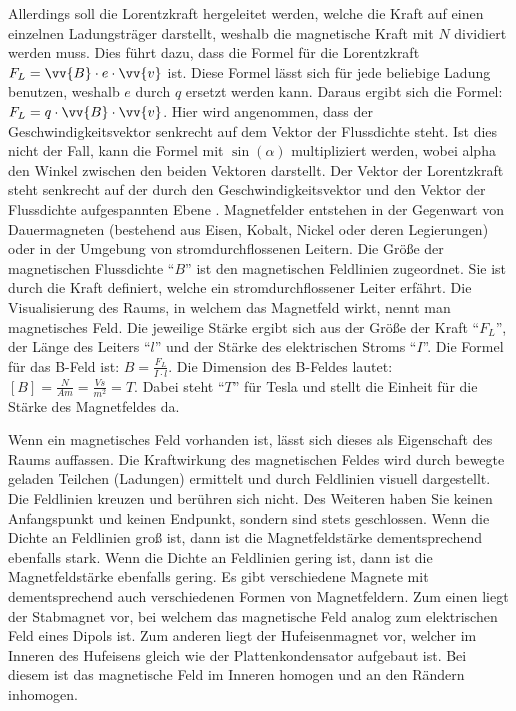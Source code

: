 Allerdings soll die Lorentzkraft hergeleitet werden, welche die Kraft auf einen einzelnen Ladungsträger darstellt, weshalb die magnetische Kraft mit $N$ dividiert werden muss.
Dies führt dazu, dass die Formel für die Lorentzkraft $F_L =\vv{B} \cdot e \cdot \vv{v}$ ist.
Diese Formel lässt sich für jede beliebige Ladung benutzen, weshalb $e$ durch $q$ ersetzt werden kann.
Daraus ergibt sich die Formel: $F_L = q \cdot \vv{B} \cdot \vv{v}$.
Hier wird angenommen, dass der Geschwindigkeitsvektor senkrecht auf dem Vektor der Flussdichte steht.
Ist dies nicht der Fall, kann die Formel mit $\sin(\alpha)$ multipliziert werden, wobei alpha den Winkel zwischen den beiden Vektoren darstellt.
Der Vektor der Lorentzkraft steht senkrecht auf der durch den Geschwindigkeitsvektor und den Vektor der Flussdichte aufgespannten Ebene \cite{Lorentzkraft}.
Magnetfelder entstehen in der Gegenwart von Dauermagneten (bestehend aus Eisen, Kobalt, Nickel oder deren Legierungen) oder in der Umgebung von stromdurchflossenen Leitern. 
Die Größe der magnetischen Flussdichte "`$B$"' ist den magnetischen Feldlinien zugeordnet.
Sie ist durch die Kraft definiert, welche ein stromdurchflossener Leiter erfährt.
Die Visualisierung des Raums, in welchem das Magnetfeld wirkt, nennt man magnetisches Feld.
Die jeweilige Stärke ergibt sich aus der Größe der Kraft "`$F_L$"', der Länge des Leiters "`$l$"' und der Stärke des elektrischen Stroms "`$I$"'.
Die Formel für das B-Feld ist: $B = \frac{F_L}{I \cdot l}$.
Die Dimension des B-Feldes lautet: $[B] = \frac{N}{Am} = \frac{Vs}{m^2} = T$.
Dabei steht "`$T$"' für Tesla und stellt die Einheit für die Stärke des Magnetfeldes da.

Wenn ein magnetisches Feld vorhanden ist, lässt sich dieses als Eigenschaft des Raums auffassen.
Die Kraftwirkung des magnetischen Feldes wird durch bewegte geladen Teilchen (Ladungen) ermittelt und durch Feldlinien visuell dargestellt.
Die Feldlinien kreuzen und berühren sich nicht.
Des Weiteren haben Sie keinen Anfangspunkt und keinen Endpunkt, sondern sind stets geschlossen.
Wenn die Dichte an Feldlinien groß ist, dann ist die Magnetfeldstärke dementsprechend ebenfalls stark.
Wenn die Dichte an Feldlinien gering ist, dann ist die Magnetfeldstärke ebenfalls gering.
Es gibt verschiedene Magnete mit dementsprechend auch verschiedenen Formen von Magnetfeldern. 
Zum einen liegt der Stabmagnet vor, bei welchem das magnetische Feld analog zum elektrischen Feld eines Dipols ist.
Zum anderen liegt der Hufeisenmagnet vor, welcher im Inneren des Hufeisens gleich wie der Plattenkondensator aufgebaut ist.
Bei diesem ist das magnetische Feld im Inneren homogen und an den Rändern inhomogen. 
